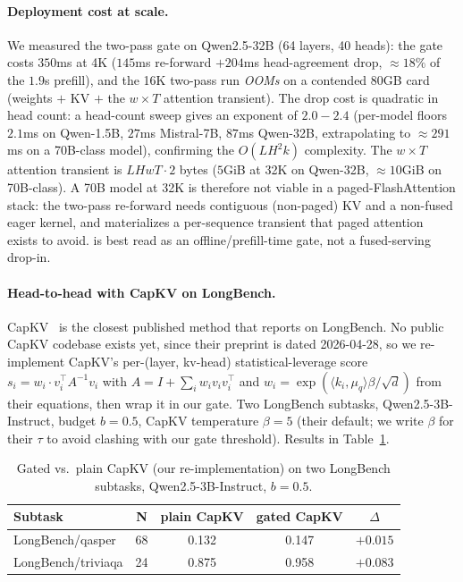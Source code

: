 \paragraph{Deployment cost at scale.} We measured the two-pass gate on
Qwen2.5-32B (64 layers, 40 heads): the gate costs $350$ms at 4K ($145$ms
re-forward $+ 204$ms head-agreement drop, $\approx 18\%$ of the $1.9$s prefill),
and the 16K two-pass run \emph{OOMs} on a contended 80GB card (weights $+$ KV
$+$ the $w \times T$ attention transient). The drop cost is quadratic in head
count: a head-count sweep gives an exponent of $2.0 - 2.4$ (per-model floors
$2.1$ms on Qwen-1.5B, $27$ms Mistral-7B, $87$ms Qwen-32B, extrapolating to
$\approx 291$ms on a 70B-class model), confirming the $O(L H^2 k)$ complexity.
The $w \times T$ attention transient is $L H w T \cdot 2$ bytes ($5$GiB at 32K
on Qwen-32B, $\approx 10$GiB on 70B-class). A 70B model at 32K is therefore not
viable in a paged-FlashAttention stack: the two-pass re-forward needs contiguous
(non-paged) KV and a non-fused eager kernel, and materializes a per-sequence
transient that paged attention exists to avoid. \method is best read as an
offline/prefill-time gate, not a fused-serving drop-in.

\paragraph{Head-to-head with CapKV on LongBench.}
CapKV~\citep{arxiv260425975} is the closest published method that
reports on LongBench. No public CapKV codebase exists yet, since their
preprint is dated 2026-04-28, so we re-implement CapKV's per-(layer, kv-head)
statistical-leverage score $s_i = w_i \cdot v_i^\top A^{-1} v_i$ with
$A = I + \sum_i w_i v_i v_i^\top$ and $w_i = \exp(\langle k_i,
\mu_q\rangle \beta / \sqrt d)$ from their equations,
then wrap it in our gate. Two
LongBench subtasks, Qwen2.5-3B-Instruct, budget $b = 0.5$, CapKV
temperature $\beta = 5$ (their default; we write $\beta$ for their
$\tau$ to avoid clashing with our gate threshold). Results in
Table~\ref{tab:capkv}.

\begin{table}[h]
\centering
\caption{Gated vs.\ plain CapKV (our re-implementation) on two
LongBench subtasks, Qwen2.5-3B-Instruct, $b = 0.5$.}
\label{tab:capkv}
\begin{tabular}{lcccc}
\toprule
Subtask & N & plain CapKV & gated CapKV & $\Delta$ \\
\midrule
LongBench/qasper   & 68 & 0.132 & 0.147 & $+0.015$ \\
LongBench/triviaqa & 24 & 0.875 & 0.958 & $+0.083$ \\
\bottomrule
\end{tabular}
\end{table}

